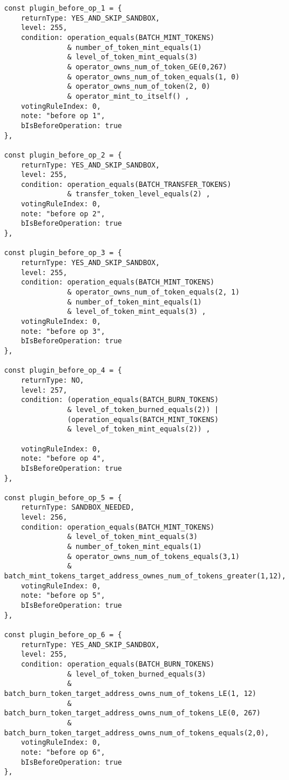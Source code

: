 \documentclass[main.tex]{subfiles}
\begin{document}
\begin{verbatim}
const plugin_before_op_1 = {
    returnType: YES_AND_SKIP_SANDBOX,
    level: 255, 
    condition: operation_equals(BATCH_MINT_TOKENS)
               & number_of_token_mint_equals(1) 
               & level_of_token_mint_equals(3) 
               & operator_owns_num_of_token_GE(0,267) 
               & operator_owns_num_of_token_equals(1, 0)
               & operator_owns_num_of_token(2, 0)
               & operator_mint_to_itself() ,
    votingRuleIndex: 0, 
    note: "before op 1",
    bIsBeforeOperation: true  
},

const plugin_before_op_2 = {
    returnType: YES_AND_SKIP_SANDBOX,
    level: 255, 
    condition: operation_equals(BATCH_TRANSFER_TOKENS)
               & transfer_token_level_equals(2) ,
    votingRuleIndex: 0, 
    note: "before op 2",
    bIsBeforeOperation: true  
},

const plugin_before_op_3 = {
    returnType: YES_AND_SKIP_SANDBOX,
    level: 255, 
    condition: operation_equals(BATCH_MINT_TOKENS)
               & operator_owns_num_of_token_equals(2, 1)
               & number_of_token_mint_equals(1) 
               & level_of_token_mint_equals(3) ,
    votingRuleIndex: 0, 
    note: "before op 3",
    bIsBeforeOperation: true  
},

const plugin_before_op_4 = {
    returnType: NO,
    level: 257, 
    condition: (operation_equals(BATCH_BURN_TOKENS)
               & level_of_token_burned_equals(2)) |
               (operation_equals(BATCH_MINT_TOKENS)
               & level_of_token_mint_equals(2)) ,

    votingRuleIndex: 0, 
    note: "before op 4",
    bIsBeforeOperation: true  
},

const plugin_before_op_5 = {
    returnType: SANDBOX_NEEDED,
    level: 256, 
    condition: operation_equals(BATCH_MINT_TOKENS)
               & level_of_token_mint_equals(3)
               & number_of_token_mint_equals(1)
               & operator_owns_num_of_tokens_equals(3,1)
               & batch_mint_tokens_target_address_ownes_num_of_tokens_greater(1,12),
    votingRuleIndex: 0, 
    note: "before op 5",
    bIsBeforeOperation: true  
},

const plugin_before_op_6 = {
    returnType: YES_AND_SKIP_SANDBOX,
    level: 255, 
    condition: operation_equals(BATCH_BURN_TOKENS)
               & level_of_token_burned_equals(3)
               & batch_burn_token_target_address_owns_num_of_tokens_LE(1, 12)
               & batch_burn_token_target_address_owns_num_of_tokens_LE(0, 267)
               & batch_burn_token_target_address_owns_num_of_tokens_equals(2,0),
    votingRuleIndex: 0, 
    note: "before op 6",
    bIsBeforeOperation: true  
},


\end{verbatim}
\end{document}
